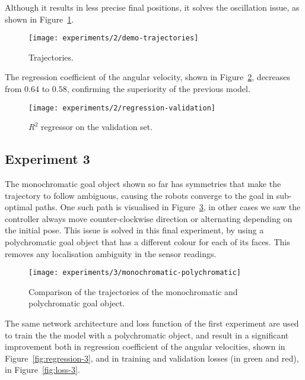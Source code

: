  
Although it results in less precise final positions, it solves the oscillation 
issue, as shown in Figure~\ref{fig:demo-trajectories}.

\begin{figure}[htbp]
	\centerline{\texttt{[image: experiments/2/demo-trajectories]}}
	\caption{Trajectories.}
	\label{fig:demo-trajectories}
\end{figure}

The regression coefficient of the angular velocity, shown in 
Figure~\ref{fig:regression-validation}, decreases from $0.64$ to $0.58$, 
confirming the superiority of the previous model.

\begin{figure}[htbp]
	\centerline{\texttt{[image: experiments/2/regression-validation]}}
	\caption{$R^2$ regressor on the validation set.}
	\label{fig:regression-validation}
\end{figure}

\subsection{Experiment 3}
\label{experiment3}

The monochromatic goal object shown so far has symmetries that make the 
trajectory to follow ambiguous, causing the robots converge to the goal in 
sub-optimal paths. One such path is visualised in 
Figure~\ref{fig:demo-circle-trajectories}, in other cases we saw the controller 
always move counter-clockwise direction or alternating depending on the 
initial pose.
This issue is solved in this final experiment, by using a polychromatic goal 
object that has a different colour for each of its faces. This removes any 
localisation ambiguity in the sensor readings.

\begin{figure}[htbp]
	\centerline{\texttt{[image: experiments/3/monochromatic-polychromatic]}}
	\caption{Comparison of the trajectories of the monochromatic and 
	polychromatic goal object.}
	\label{fig:demo-circle-trajectories}
\end{figure}

The same network architecture and loss function of the first experiment are 
used to train the the model with a polychromatic object, and result in a 
significant improvement both in regression coefficient of the angular 
velocities, shown in Figure~\ref{fig:regression-3}, and in training and 
validation losses (in green and red), in Figure~\ref{fig:loss-3}.

